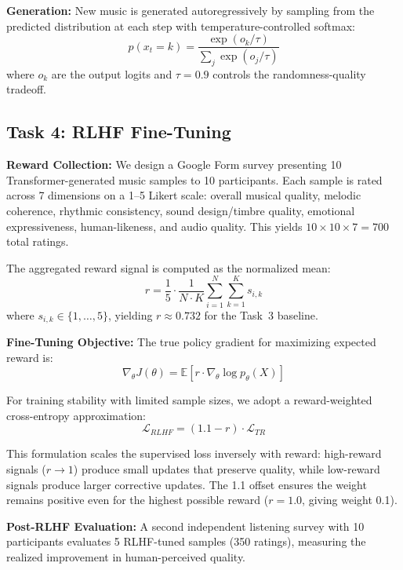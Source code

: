 \documentclass[conference]{IEEEtran}
\begin{document}
\textbf{Generation:} New music is generated autoregressively by sampling from the predicted distribution at each step with temperature-controlled softmax:
\begin{equation}
p(x_t = k) = \frac{\exp(o_k / \tau)}{\sum_j \exp(o_j / \tau)}
\end{equation}
where $o_k$ are the output logits and $\tau = 0.9$ controls the randomness-quality tradeoff.

\subsection{Task 4: RLHF Fine-Tuning}

\textbf{Reward Collection:} We design a Google Form survey presenting 10 Transformer-generated music samples to 10 participants. Each sample is rated across 7 dimensions on a 1--5 Likert scale: overall musical quality, melodic coherence, rhythmic consistency, sound design/timbre quality, emotional expressiveness, human-likeness, and audio quality. This yields $10 \times 10 \times 7 = 700$ total ratings.

The aggregated reward signal is computed as the normalized mean:
\begin{equation}
r = \frac{1}{5} \cdot \frac{1}{N \cdot K} \sum_{i=1}^{N} \sum_{k=1}^{K} s_{i,k}
\end{equation}
where $s_{i,k} \in \{1,\ldots,5\}$, yielding $r \approx 0.732$ for the Task~3 baseline.

\textbf{Fine-Tuning Objective:} The true policy gradient for maximizing expected reward is:
\begin{equation}
\nabla_\theta J(\theta) = \mathbb{E}\left[r \cdot \nabla_\theta \log p_\theta(X)\right]
\end{equation}

For training stability with limited sample sizes, we adopt a reward-weighted cross-entropy approximation:
\begin{equation}
\mathcal{L}_{RLHF} = (1.1 - r) \cdot \mathcal{L}_{TR}
\end{equation}

This formulation scales the supervised loss inversely with reward: high-reward signals ($r \to 1$) produce small updates that preserve quality, while low-reward signals produce larger corrective updates. The 1.1 offset ensures the weight remains positive even for the highest possible reward ($r = 1.0$, giving weight 0.1).

\textbf{Post-RLHF Evaluation:} A second independent listening survey with 10 participants evaluates 5 RLHF-tuned samples (350 ratings), measuring the realized improvement in human-perceived quality.
\end{document}
